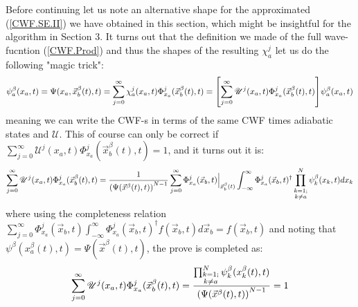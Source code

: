 \documentclass[11pt, a4paper]{article} %
\newcommand{\U}{\mathscr{U}}
\begin{document}
Before continuing let us note an alternative shape for the approximated (\ref{CWF.SE.II}) we have obtained in this section, which might be insightful for the algorithm in Section 3. It turns out that the definition we made of the full wave-fucntion (\ref{CWF.Prod}) and thus the shapes of the resulting  $\chi^j_a$ let us do the following "magic trick":
$$
\psi^\beta_a(x_a,t)=\Psi(x_a,\vec{x}_b^\beta(t),t)=\sum_{j=0}^\infty \chi^j_a(x_a,t)\Phi^j_{x_a}(\vec{x}_b^\beta(t),t)=\qty[ \sum_{j=0}^\infty\U^j(x_a,t)\Phi^j_{x_a}(\vec{x}_b^\beta(t),t)]\psi^\beta_a(x_a,t)
$$
meaning we can write the CWF-s in terms of the same CWF times adiabatic states and $\U$. This of course can only be correct if $\sum_{j=0}^\infty\U^j(x_a,t)\Phi^j_{x_a}(\vec{x}_b^\beta(t),t)=1$, and it turns out it is:
$$
\sum_{j=0}^\infty\U^j(x_a,t)\Phi^j_{x_a}(\vec{x}_b^\beta(t),t) = \frac{1}{ \qty(\Psi(\vec{x}^\beta(t),t))^{N-1}} \sum_{j=0}^\infty \Phi^j_{x_a}(\vec{x}_b,t)\Big\rvert_{\vec{x}_b^\beta(t)}\int_{-\infty}^\infty \Phi_{x_a}^j(\vec{x}_b,t)^\dagger \prod_{\substack{k=1; \\ k\neq a}}^{N}\psi^\beta_k(x_k,t) dx_k 
$$
where using the completeness relation $\sum_{j=0}^\infty \Phi^j_{x_a}(\vec{x}_b,t)\int_{-\infty}^\infty \Phi_{x_a}^j(\vec{x}_b,t)^\dagger f(\vec{x}_b,t)d\vec{x}_b = f(\vec{x}_b,t)$ and noting that $\psi^\beta(x_a^\beta(t),t)=\Psi(\vec{x}^\beta(t),t)$, the prove is completed as:
$$
\sum_{j=0}^\infty\U^j(x_a,t)\Phi^j_{x_a}(\vec{x}_b^\beta(t),t)=\frac{ \prod_{\substack{k=1; \\ k\neq a}}^{N}\psi^\beta_k(x_k^\beta(t),t)}{ \qty(\Psi(\vec{x}^\beta(t),t))^{N-1}}=1
$$
\end{document}

